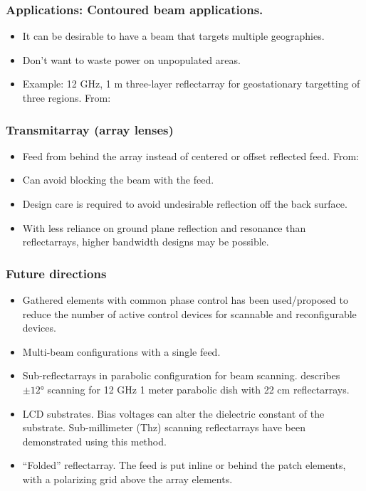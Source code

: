 \begin{frame}
\frametitle{Applications: Contoured beam applications.}

\begin{itemize}
\item It can be desirable to have a beam that targets multiple geographies.
\item Don't want to waste power on unpopulated areas.
\item Example: 12 \si{GHz}, 1 \si{m} three-layer reflectarray for geostationary targetting of three regions. From: \citep{encinar2004three}
\end{itemize}

\end{frame}


\begin{frame}
\frametitle{Transmitarray (array lenses)}
\begin{itemize}
\item Feed from behind the array instead of centered or offset reflected feed.  From: \citep{lau2012reconfigurable}
\item Can avoid blocking the beam with the feed.
\item Design care is required to avoid undesirable reflection off the back surface.
\item With less reliance on ground plane reflection and resonance than reflectarrays, higher bandwidth designs may be possible.
\end{itemize}
\end{frame}

\begin{frame}[allowframebreaks]
\frametitle{Future directions}
\begin{itemize}
\item Gathered elements with common phase control has been used/proposed to reduce the number of active control devices for scannable and reconfigurable devices.  \citep{carrasco2012recent}
\item Multi-beam configurations with a single feed. \citep{carrasco2012recent}
\item Sub-reflectarrays in parabolic configuration for beam scanning.  \citep{arrebola2010phase} describes \( \pm \ang{12} \) scanning for 12 \si{GHz} 1 meter parabolic dish with 22 \si{cm} reflectarrays.
\item LCD substrates.  Bias voltages can alter the dielectric constant of the substrate.  Sub-millimeter (\si{Thz}) scanning reflectarrays have been demonstrated using this method.
\item ``Folded'' reflectarray.  The feed is put inline or behind the patch elements, with a polarizing grid above the array elements.
\end{itemize}
\end{frame}

